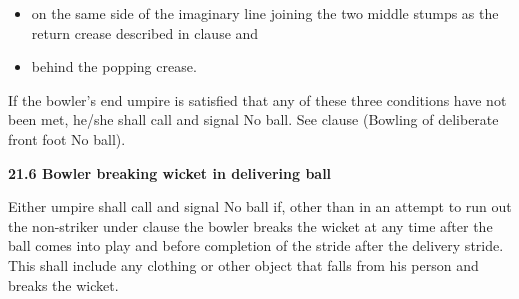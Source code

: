 \documentclass[12pt]{article}
\begin{document}
\vspace{\baselineskip}
\begin{itemize}
	\item {\fontsize{9pt}{10.8pt}\selectfont on the same side of the imaginary line joining the two middle stumps as the return crease described in clause and\par}\par


\vspace{\baselineskip}
	\item {\fontsize{9pt}{10.8pt}\selectfont behind the popping crease.\par}
\end{itemize}\par


\vspace{\baselineskip}
\begin{adjustwidth}{0.0in}{0.29in}
{\fontsize{9pt}{10.8pt}\selectfont If the bowler’s end umpire is satisfied that any of these three conditions have not been met, he/she shall call and signal No ball. See clause (Bowling of deliberate front foot No ball).\par}\par

\end{adjustwidth}


\vspace{\baselineskip}

\vspace{\baselineskip}

\vspace{\baselineskip}
\begin{Center}
{\fontsize{8pt}{9.6pt}\par}
\end{Center}\par


\vspace{\baselineskip}
{\fontsize{11pt}{13.2pt}\selectfont \textbf{21.6 \tabto{0.47in} Bowler breaking wicket in delivering ball}\par}\par


\vspace{\baselineskip}
\begin{adjustwidth}{0.0in}{0.19in}
\begin{justify}
{\fontsize{9pt}{10.8pt}\selectfont Either umpire shall call and signal No ball if, other than in an attempt to run out the non-striker under clause  the bowler breaks the wicket at any time after the ball comes into play and before completion of the stride after the delivery stride. This shall include any clothing or other object that falls from his person and breaks the wicket.\par}
\end{justify}\par

\end{adjustwidth}
\end{document}
